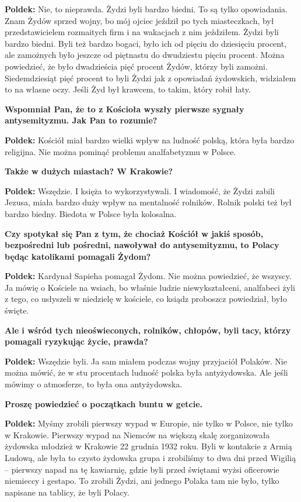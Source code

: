 \begin{otherlanguage}{polish}
\textbf{Poldek:} Nie, to nieprawda. Żydzi byli bardzo biedni. To są tylko opowiadania. Znam Żydów sprzed wojny, bo mój ojciec jeździł po tych miasteczkach, był przedstawicielem rozmaitych firm i na wakacjach z nim jeździłem. Żydzi byli bardzo biedni. Byli też bardzo bogaci, było ich od pięciu do dziesięciu procent, ale zamożnych było jeszcze od piętnastu do dwudziestu pięciu procent. Można powiedzieć, że było dwadzieścia pięć procent Żydów, którzy byli zamożni. Siedemdziesiąt pięć procent to byli Żydzi jak z opowiadań żydowskich, widziałem to na własne oczy. Jeśli Żyd był krawcem, to takim, który robił łaty.

\textbf{Wspomniał Pan, że to z Kościoła wyszły pierwsze sygnały antysemityzmu. Jak Pan to rozumie?}

\textbf{Poldek:} Kościół miał bardzo wielki wpływ na ludność polską, która była bardzo religijna. Nie można pominąć problemu analfabetyzmu w Polsce.

\textbf{Także w dużych miastach? W Krakowie?}

\textbf{Poldek:} Wszędzie. I księża to wykorzystywali. I wiadomość, że Żydzi zabili Jezusa, miała bardzo duży wpływ na mentalność rolników. Rolnik polski też był bardzo biedny. Biedota w Polsce była kolosalna.
 
\textbf{Czy spotykał się Pan z tym, że chociaż Kościół w jakiś sposób, bezpośredni lub pośredni, nawoływał do antysemityzmu, to Polacy będąc katolikami pomagali Żydom?}

\textbf{Poldek:} Kardynał Sapieha pomagał Żydom. Nie można powiedzieć, że wszyscy. Ja mówię o Kościele na wsiach, bo właśnie ludzie niewykształceni, analfabeci żyli z tego, co usłyszeli w niedzielę w kościele, co ksiądz proboszcz powiedział, było święte.

\textbf{Ale i wśród tych nieoświeconych, rolników, chłopów, byli tacy, którzy pomagali ryzykując życie, prawda?}

\textbf{Poldek:} Wszędzie byli. Ja sam miałem podczas wojny przyjaciół Polaków. Nie można mówić, że w stu procentach ludność polska była antyżydowska. Ale jeśli mówimy o atmosferze, to była ona antyżydowska.

\textbf{Proszę powiedzieć o początkach buntu w getcie.}
 
\textbf{Poldek:} Myśmy zrobili pierwszy wypad w Europie, nie tylko w Polsce, nie tylko w Krakowie. Pierwszy wypad na Niemców na większą skalę zorganizowała żydowska młodzież w Krakowie 22 grudnia 1932 roku. Byli w kontakcie z Armią Ludową, ale była to czysto żydowska grupa i zrobiliśmy to dwa dni przed Wigilią – pierwszy napad na tę kawiarnię, gdzie byli przed świętami wyżsi oficerowie niemieccy i gestapo. To zrobili Żydzi, ani jednego Polaka tam nie było, tylko napisane na tablicy, że byli Polacy.


\end{otherlanguage}
